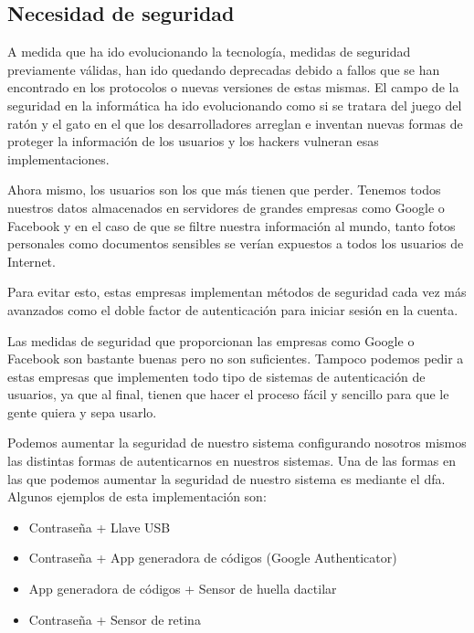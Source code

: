 \documentclass[titlepage, 12pt, a4paper]{article}
\begin{document}
\subsection{Necesidad de seguridad}
A medida que ha ido evolucionando la tecnología, medidas de seguridad previamente válidas, han ido quedando deprecadas debido a fallos que se han encontrado en los protocolos o nuevas versiones de estas mismas. El campo de la seguridad en la informática ha ido evolucionando como si se tratara del juego del ratón y el gato en el que los desarrolladores arreglan e inventan nuevas formas de proteger la información de los usuarios y los hackers vulneran esas implementaciones.\par Ahora mismo, los usuarios son los que más tienen que perder. Tenemos todos nuestros datos almacenados en servidores de grandes empresas como Google o Facebook y en el caso de que se filtre nuestra información al mundo, tanto fotos personales como documentos sensibles se verían expuestos a todos los usuarios de Internet.\par Para evitar esto, estas empresas implementan métodos de seguridad cada vez más avanzados como el doble factor de autenticación para iniciar sesión en la cuenta.\par Las medidas de seguridad que proporcionan las empresas como Google o Facebook son bastante buenas pero no son suficientes. Tampoco podemos pedir a estas empresas que implementen todo tipo de sistemas de autenticación de usuarios, ya que al final, tienen que hacer el proceso fácil y sencillo para que le gente quiera y sepa usarlo.\par Podemos aumentar la seguridad de nuestro sistema configurando nosotros mismos las distintas formas de autenticarnos en nuestros sistemas. Una de las formas en las que podemos aumentar la seguridad de nuestro sistema es mediante el \Gls{dfa}. Algunos ejemplos de esta implementación son:
\begin{itemize}
	\item Contraseña + Llave USB
	\item Contraseña + App generadora de códigos (Google Authenticator)
	\item App generadora de códigos + Sensor de huella dactilar
	\item Contraseña + Sensor de retina
\end{itemize}
\end{document}
